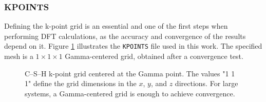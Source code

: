 \subsubsection{KPOINTS}
Defining the k-point grid is an essential and one of the first steps when performing DFT calculations, as the accuracy and convergence of the results depend on it. Figure \ref{kpoints} illustrates the \texttt{KPOINTS} file used in this work. The specified mesh is a $1\times 1\times 1$ Gamma-centered grid, obtained after a convergence test. 
\begin{figure}[H]
	\centering
	\caption{ C--S--H k-point grid centered at the Gamma point. The values "1 1 1" define the grid dimensions in the $x$, $y$, and $z$ directions. For large systems, a Gamma-centered grid is enough to achieve convergence.}
	\label{kpoints}
\end{figure}

